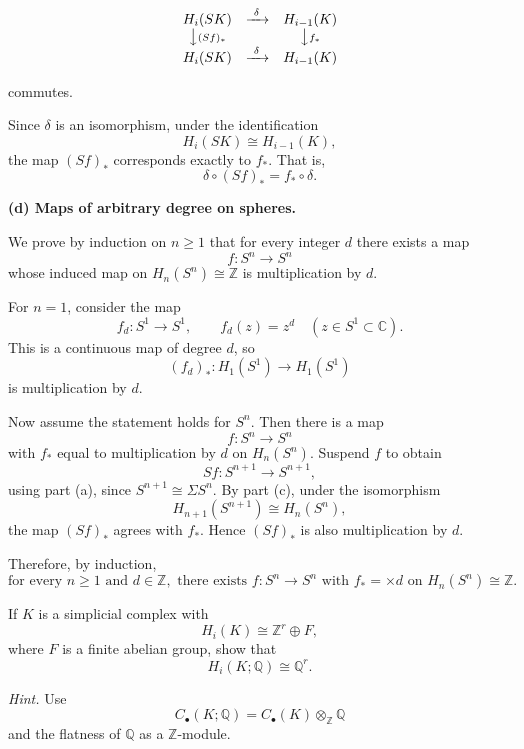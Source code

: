\begin{solution}
\[
\begin{array}{ccc}
H_i(SK)&\xrightarrow{\ \delta\ }&H_{i-1}(K)\\
\big\downarrow{\scriptstyle (Sf)_*}&&\big\downarrow{\scriptstyle f_*}\\
H_i(SK)&\xrightarrow{\ \delta\ }&H_{i-1}(K)
\end{array}
\]


commutes.

Since \(\delta\) is an isomorphism, under the identification
\[
H_i(SK)\cong H_{i-1}(K),
\]
the map \((Sf)_*\) corresponds exactly to \(f_*\). That is,
\[
\boxed{\delta\circ (Sf)_*=f_*\circ \delta.}
\]

\par

\textbf{(d) Maps of arbitrary degree on spheres.}

We prove by induction on \(n\ge 1\) that for every integer \(d\) there exists a map
\[
f:S^n\to S^n
\]
whose induced map on \(H_n(S^n)\cong \mathbb Z\) is multiplication by \(d\).

For \(n=1\), consider the map
\[
f_d:S^1\to S^1,
\qquad
f_d(z)=z^d
\quad (z\in S^1\subset \mathbb C).
\]
This is a continuous map of degree \(d\), so
\[
(f_d)_*:H_1(S^1)\to H_1(S^1)
\]
is multiplication by \(d\).

Now assume the statement holds for \(S^n\). Then there is a map
\[
f:S^n\to S^n
\]
with \(f_*\) equal to multiplication by \(d\) on \(H_n(S^n)\). Suspend \(f\) to obtain
\[
Sf:S^{n+1}\to S^{n+1},
\]
using part (a), since \(S^{n+1}\cong \Sigma S^n\). By part (c), under the isomorphism
\[
H_{n+1}(S^{n+1})\cong H_n(S^n),
\]
the map \((Sf)_*\) agrees with \(f_*\). Hence \((Sf)_*\) is also multiplication by \(d\).

Therefore, by induction,
\[
\boxed{\text{for every }n\ge 1\text{ and }d\in\mathbb Z,\text{ there exists }f:S^n\to S^n
	\text{ with }f_*=\times d\text{ on }H_n(S^n)\cong \mathbb Z.}
\]
\end{solution}

\begin{problem}
If \(K\) is a simplicial complex with
\[
H_i(K)\cong \mathbb Z^r\oplus F,
\]
where \(F\) is a finite abelian group, show that
\[
H_i(K;\mathbb Q)\cong \mathbb Q^r.
\]

\emph{Hint.} Use
\[
C_\bullet(K;\mathbb Q)
=
C_\bullet(K)\otimes_{\mathbb Z}\mathbb Q
\]
and the flatness of \(\mathbb Q\) as a \(\mathbb Z\)-module.
\end{problem}

